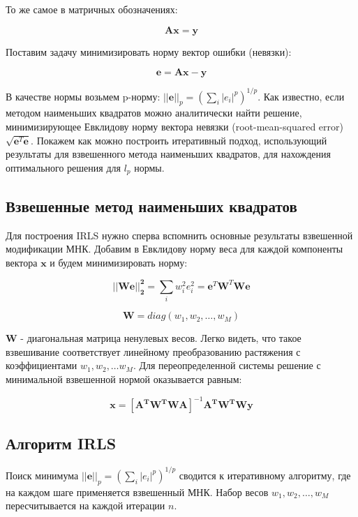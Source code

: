 То же самое в матричных обозначениях:

\[
    \boldsymbol{A} \boldsymbol{x} = \boldsymbol{y}
\]

Поставим задачу минимизировать норму вектор ошибки (невязки):

\[
    \boldsymbol{e} = \boldsymbol{A} \boldsymbol{x} - \boldsymbol{y} 
\]

В качестве нормы возьмем p-норму: $||\boldsymbol{e}||_p = \left( \sum_i |e_i|^p \right)^{1/p}$. Как известно, если методом наименьших квадратов можно аналитически найти решение, минимизирующее Евклидову норму вектора невязки (root-mean-squared error) $\sqrt{\boldsymbol{e}^T \boldsymbol{e}}$. Покажем как можно построить итеративный подход, использующий результаты для взвешенного метода наименьших квадратов, для нахождения оптимального решения для $l_p$ нормы.

\subsection{Взвешенные метод наименьших квадратов}

Для построения IRLS нужно сперва вспомнить основные результаты взвешенной модификации МНК. Добавим в Евклидову норму веса для каждой компоненты вектора $\boldsymbol{x}$ и будем минимизировать норму:

\[
    \boldsymbol{||W e||_2^2} = \sum_i w_i^2 e_i^2 = \boldsymbol{e}^T \boldsymbol{W}^T \boldsymbol{W} \boldsymbol{e} 
\]

\[
    \boldsymbol{W} = diag(w_1, w_2, \dots, w_M)
\]

$\boldsymbol{W}$ - диагональная матрица ненулевых весов. Легко видеть, что такое взвешивание соответствует линейному преобразованию растяжения с коэффициентами $w_1, w_2, \dots w_M$. Для переопределенной системы решение с минимальной взвешенной нормой оказывается равным:

\[
    \boldsymbol{x} = \left[ \boldsymbol{A^T W^T W A} \right]^{-1} \boldsymbol{A^T W^T W y}
\]

\subsection{Алгоритм \textbf{IRLS}}

Поиск минимума $||\boldsymbol{e}||_p = \left( \sum_i |e_i|^p \right)^{1/p}$ сводится к итеративному алгоритму, где на каждом шаге применяется взвешенный МНК. Набор весов $w_1, w_2, \dots, w_M$ пересчитывается на каждой итерации $n$.


